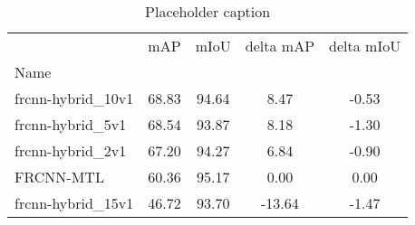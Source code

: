 \begin{table}[htbp]
\centering
\caption{Placeholder caption}
\label{tab:constant}
\begin{tabular}{lcccc}
\toprule
 & mAP & mIoU & delta mAP & delta mIoU \\
Name &  &  &  &  \\
\midrule
frcnn-hybrid_10v1 & 68.83 & 94.64 & 8.47 & -0.53 \\
frcnn-hybrid_5v1 & 68.54 & 93.87 & 8.18 & -1.30 \\
frcnn-hybrid_2v1 & 67.20 & 94.27 & 6.84 & -0.90 \\
FRCNN-MTL & 60.36 & 95.17 & 0.00 & 0.00 \\
frcnn-hybrid_15v1 & 46.72 & 93.70 & -13.64 & -1.47 \\
\bottomrule
\end{tabular}
\end{table}
